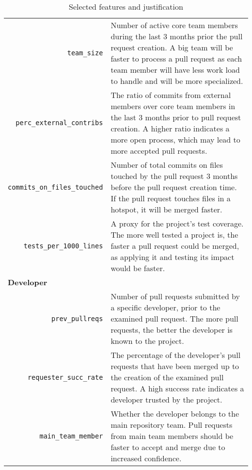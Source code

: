 \documentclass{sig-alternate}
\begin{document}
\begin{table*}
\begin{small}
\begin{tabular}{rp{40em}}
    \texttt{team\_size} & Number of active core team members during the last
    3 months prior the pull request creation. A big team will be faster to process a
    pull request as each team member will have less work load to handle and
    will be more specialized.\\

    \texttt{perc\_external\_contribs} & The ratio of commits from external
    members over core team members in the last 3 months prior to pull request
    creation. A higher ratio indicates a more open
    process, which may lead to more accepted pull requests.\\

    \texttt{commits\_on\_files\_touched} & Number of total commits on files
    touched by the pull request 3 months before the pull request creation time.
    If the pull request touches files in a hotspot, it will be merged faster.\\
 
    \texttt{tests\_per\_1000\_lines} & A proxy for the project's test
    coverage. The more well tested a project is, the faster a pull request
    could be merged, as applying it and testing its impact would be faster. \\

    \multicolumn{2}{l}{\bf{Developer}}\\
    
    \texttt{prev\_pullreqs} & Number of pull requests submitted by a specific
    developer, prior to the examined pull request. The more pull requests, the
    better the developer is known to the project.\\

    \texttt{requester\_succ\_rate} & The percentage of the developer's pull requests that have been merged up to the creation of the examined pull
    request. A high success rate indicates a developer trusted by the project.\\

    \texttt{main\_team\_member} & Whether the developer belongs to the
    main repository team. Pull requests from main team members should be
    faster to accept and merge due to increased confidence.\\
    \hline
  \end{tabular}
  \caption{Selected features and justification}
  \label{tab:features}
  \end{small}
\end{table*}
\end{document}

